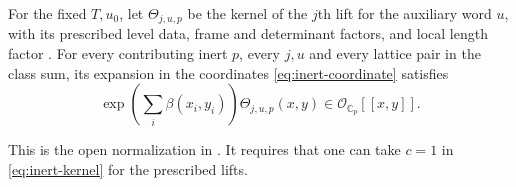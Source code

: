 \begin{hypothesis}[\openinput]\label{hyp:inert-kernel-integrality}
For the fixed $T,u_0$, let $\Theta_{j,u,p}$ be the kernel of the
$j$th lift for the auxiliary word $u$, with its prescribed level data,
frame and determinant factors, and local length factor
\citep[Definition~11.9]{adriazola-grh}. For every contributing inert
$p$, every $j,u$ and every lattice pair in the class sum, its expansion
in the coordinates \eqref{eq:inert-coordinate} satisfies
\[
   \exp\!\left(\sum_i\beta(x_i,y_i)\right)\Theta_{j,u,p}(x,y)
       \in\mathcal O_{\mathbb C_p}[[x,y]] .
\]
\end{hypothesis}

This is the open normalization in \citep[Hypothesis~11.42]{adriazola-grh}.
It requires that one can take $c=1$ in \eqref{eq:inert-kernel} for the
prescribed lifts.
